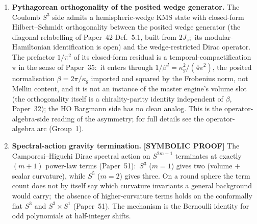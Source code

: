 \documentclass[aps,pra,twocolumn,superscriptaddress,longbibliography]{revtex4-2}
\begin{document}
\begin{enumerate}
\item \textbf{Pythagorean orthogonality of the posited wedge generator.}
The Coulomb $S^3$ side admits a hemispheric-wedge KMS state with
closed-form Hilbert--Schmidt orthogonality between the posited wedge
generator (the diagonal relabelling of Paper~42 Def.~5.1, built from
$2J_z$;\ its modular-Hamiltonian identification is open) and the
wedge-restricted Dirac operator.
The prefactor $1/\pi^2$ of its closed-form residual is a
temporal-compactification $\pi$ in the sense of Paper~35:\ it enters
through $1/\beta^2 = \kappa_g^2/(4\pi^2)$, the posited normalisation
$\beta = 2\pi/\kappa_g$ imported and squared by the Frobenius norm, not Mellin
content, and it is not an instance of the master engine's volume slot
(the orthogonality itself is a chirality-parity identity independent of
$\beta$, Paper~32); the HO
Bargmann side has no clean analog.  This is the
operator-algebra-side reading of the asymmetry; for full
details see the operator-algebra arc (Group~1).

\item \textbf{Spectral-action gravity termination.}  \textbf{[SYMBOLIC PROOF]} The
Camporesi--Higuchi Dirac spectral action on $S^{2m+1}$ terminates at
exactly $(m{+}1)$ power-law terms (Paper~51):\ $S^3$ ($m = 1$) gives
two (volume $+$ scalar curvature), while $S^5$ ($m = 2$) gives three.
On a round sphere the term count does not by itself say which
curvature invariants a general background would carry;\ the absence of
higher-curvature terms holds on the conformally flat $S^3$ and
$S^3 \times S^1$ (Paper~51).  The mechanism is the Bernoulli identity
for odd polynomials at half-integer shifts.


\end{enumerate}
\end{document}
